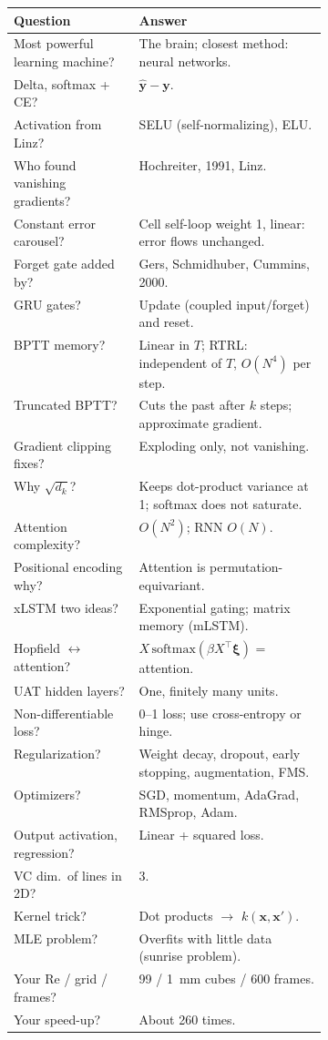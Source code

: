 \begin{center}\small
\begin{tabularx}{\linewidth}{@{}>{\raggedright\arraybackslash}p{0.40\linewidth}X@{}}
\toprule
Question & Answer \\ \midrule
Most powerful learning machine? & The brain; closest method: neural networks. \\
Delta, softmax + CE? & $\hat{\mathbf{y}}-\mathbf{y}$. \\
Activation from Linz? & SELU (self-normalizing), ELU. \\
Who found vanishing gradients? & Hochreiter, 1991, Linz. \\
Constant error carousel? & Cell self-loop weight 1, linear: error flows unchanged. \\
Forget gate added by? & Gers, Schmidhuber, Cummins, 2000. \\
GRU gates? & Update (coupled input/forget) and reset. \\
BPTT memory? & Linear in $T$; RTRL: independent of $T$, $O(N^4)$ per step. \\
Truncated BPTT? & Cuts the past after $k$ steps; approximate gradient. \\
Gradient clipping fixes? & Exploding only, not vanishing. \\
Why $\sqrt{d_k}$? & Keeps dot-product variance at 1; softmax does not saturate. \\
Attention complexity? & $O(N^2)$; RNN $O(N)$. \\
Positional encoding why? & Attention is permutation-equivariant. \\
xLSTM two ideas? & Exponential gating; matrix memory (mLSTM). \\
Hopfield $\leftrightarrow$ attention? & $X\,\mathrm{softmax}(\beta X^\top\bm\xi)$ = attention. \\
UAT hidden layers? & One, finitely many units. \\
Non-differentiable loss? & 0--1 loss; use cross-entropy or hinge. \\
Regularization? & Weight decay, dropout, early stopping, augmentation, FMS. \\
Optimizers? & SGD, momentum, AdaGrad, RMSprop, Adam. \\
Output activation, regression? & Linear + squared loss. \\
VC dim.\ of lines in 2D? & 3. \\
Kernel trick? & Dot products $\to$ $k(\mathbf{x},\mathbf{x}')$. \\
MLE problem? & Overfits with little data (sunrise problem). \\
Your Re / grid / frames? & 99 / 1~mm cubes / 600 frames. \\
Your speed-up? & About 260 times. \\
\bottomrule
\end{tabularx}
\end{center}
